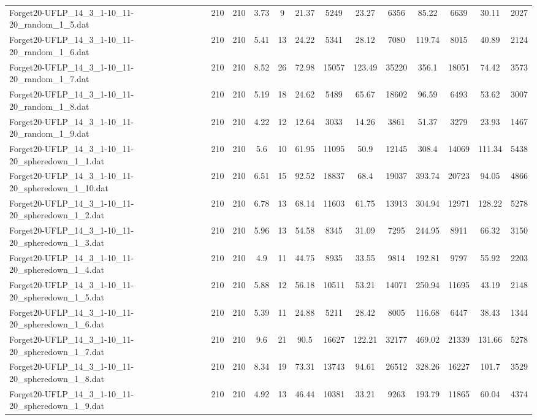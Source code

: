 \begin{table}[!ht]
{\begin{tabular}{lcccccccccccc}
Forget20-UFLP\_14\_3\_1-10\_11-20\_random\_1\_5.dat & 210 & 210 & 3.73 & 9 & 21.37 & 5249 & 23.27 & 6356 & 85.22 & 6639 & 30.11 & 2027 \\
Forget20-UFLP\_14\_3\_1-10\_11-20\_random\_1\_6.dat & 210 & 210 & 5.41 & 13 & 24.22 & 5341 & 28.12 & 7080 & 119.74 & 8015 & 40.89 & 2124 \\
Forget20-UFLP\_14\_3\_1-10\_11-20\_random\_1\_7.dat & 210 & 210 & 8.52 & 26 & 72.98 & 15057 & 123.49 & 35220 & 356.1 & 18051 & 74.42 & 3573 \\
Forget20-UFLP\_14\_3\_1-10\_11-20\_random\_1\_8.dat & 210 & 210 & 5.19 & 18 & 24.62 & 5489 & 65.67 & 18602 & 96.59 & 6493 & 53.62 & 3007 \\
Forget20-UFLP\_14\_3\_1-10\_11-20\_random\_1\_9.dat & 210 & 210 & 4.22 & 12 & 12.64 & 3033 & 14.26 & 3861 & 51.37 & 3279 & 23.93 & 1467 \\
Forget20-UFLP\_14\_3\_1-10\_11-20\_spheredown\_1\_1.dat & 210 & 210 & 5.6 & 10 & 61.95 & 11095 & 50.9 & 12145 & 308.4 & 14069 & 111.34 & 5438 \\
Forget20-UFLP\_14\_3\_1-10\_11-20\_spheredown\_1\_10.dat & 210 & 210 & 6.51 & 15 & 92.52 & 18837 & 68.4 & 19037 & 393.74 & 20723 & 94.05 & 4866 \\
Forget20-UFLP\_14\_3\_1-10\_11-20\_spheredown\_1\_2.dat & 210 & 210 & 6.78 & 13 & 68.14 & 11603 & 61.75 & 13913 & 304.94 & 12971 & 128.22 & 5278 \\
Forget20-UFLP\_14\_3\_1-10\_11-20\_spheredown\_1\_3.dat & 210 & 210 & 5.96 & 13 & 54.58 & 8345 & 31.09 & 7295 & 244.95 & 8911 & 66.32 & 3150 \\
Forget20-UFLP\_14\_3\_1-10\_11-20\_spheredown\_1\_4.dat & 210 & 210 & 4.9 & 11 & 44.75 & 8935 & 33.55 & 9814 & 192.81 & 9797 & 55.92 & 2203 \\
Forget20-UFLP\_14\_3\_1-10\_11-20\_spheredown\_1\_5.dat & 210 & 210 & 5.88 & 12 & 56.18 & 10511 & 53.21 & 14071 & 250.94 & 11695 & 43.19 & 2148 \\
Forget20-UFLP\_14\_3\_1-10\_11-20\_spheredown\_1\_6.dat & 210 & 210 & 5.39 & 11 & 24.88 & 5211 & 28.42 & 8005 & 116.68 & 6447 & 38.43 & 1344 \\
Forget20-UFLP\_14\_3\_1-10\_11-20\_spheredown\_1\_7.dat & 210 & 210 & 9.6 & 21 & 90.5 & 16627 & 122.21 & 32177 & 469.02 & 21339 & 131.66 & 5278 \\
Forget20-UFLP\_14\_3\_1-10\_11-20\_spheredown\_1\_8.dat & 210 & 210 & 8.34 & 19 & 73.31 & 13743 & 94.61 & 26512 & 328.26 & 16227 & 101.7 & 3529 \\
Forget20-UFLP\_14\_3\_1-10\_11-20\_spheredown\_1\_9.dat & 210 & 210 & 4.92 & 13 & 46.44 & 10381 & 33.21 & 9263 & 193.79 & 11865 & 60.04 & 4374 \\

\end{tabular}}
\end{table}
